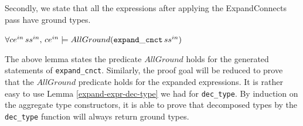 {Secondly, we state that all the expressions after applying the ExpandConnects pass
have ground types.
\begin{lemma}
$\forall ce ^{in}\,ss^{in},\,ce^{in}\models AllGround ({\tt expand\_cnct}\,ss^{in})$
\end{lemma}

The above lemma states the predicate $AllGround$ holds for the generated
statements of {\tt expand\_cnct}.
Similarly, the proof goal will be reduced to prove that the $AllGround$ predicate holds for the expanded expressions.
It is rather easy to use Lemma \ref{expand-expr-dec-type} we had for {\tt dec\_type}.
By induction on the aggregate type constructors, it is able to prove that decomposed types by
the {\tt dec\_type} function will always return ground types.
}
